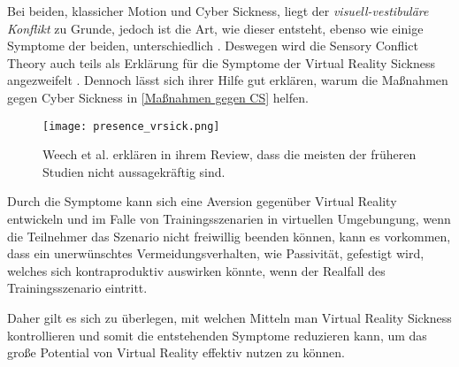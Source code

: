 Bei beiden, klassicher Motion und Cyber Sickness, liegt der \textit{visuell-vestibul\"are Konflikt} zu Grunde, jedoch ist die Art, wie dieser entsteht, ebenso wie einige Symptome der beiden, unterschiedlich \cite{Stanney:1997:MSCSSS}. Deswegen wird die Sensory Conflict Theory auch teils als Erkl\"arung f\"ur die Symptome der Virtual Reality Sickness angezweifelt  \cite{Kolasinski:1998:SympCS}. Dennoch l\"asst sich ihrer Hilfe gut erkl\"aren, warum die Ma{\ss}nahmen gegen Cyber Sickness in  \autoref{Maßnahmen gegen CS} helfen.



\begin{figure}[h]
	\centering 
	\texttt{[image: presence\_vrsick.png]}
	\caption{Weech et al.\cite{Weech:2019:PresenceCS} erkl\"aren in ihrem Review, dass die meisten der fr\"uheren Studien nicht aussagekr\"aftig sind.}
	\label{abb:presence_vrsick}
\end{figure}


Durch die Symptome kann sich eine Aversion gegen\"uber Virtual Reality entwickeln und im Falle von Trainingsszenarien in virtuellen Umgebungung, wenn die Teilnehmer das Szenario nicht freiwillig beenden k\"onnen, kann es vorkommen, dass ein unerw\"unschtes Vermeidungsverhalten, wie Passivit\"at, gefestigt wird\cite{Crowley:1987:Avoid}, welches sich kontraproduktiv auswirken k\"onnte, wenn der Realfall des Trainingsszenario eintritt.

Daher gilt es sich zu \"uberlegen, mit welchen Mitteln man Virtual Reality Sickness kontrollieren und somit die entstehenden Symptome reduzieren kann, um das gro{\ss}e Potential von Virtual Reality effektiv nutzen zu k\"onnen.

